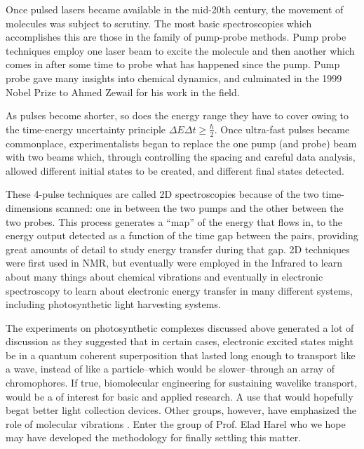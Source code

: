 Once pulsed lasers became available in the mid-20th century, the movement of molecules was subject to scrutiny.  The most basic spectroscopies which accomplishes this are those in the family of pump-probe methods.  Pump probe techniques  employ one laser beam to excite the molecule and then another which comes in after some time to probe what has happened since the pump. Pump probe gave many insights into chemical dynamics, and culminated in the 1999 Nobel Prize to Ahmed Zewail for his work in the field\cite{Zewail}.

As pulses become shorter, so does the energy range they have to cover owing to the time-energy uncertainty principle $\Delta E \Delta t \geq \frac{\hbar}{2} $.  Once ultra-fast pulses became commonplace, experimentalists began to replace the one pump (and probe) beam with two beams which, through controlling the spacing and careful data analysis, allowed different initial states to be created, and different final states detected.

These 4-pulse techniques are called 2D spectroscopies because of the two time-dimensions scanned: one in between the two pumps and the other between the two probes.  This process generates a ``map'' of the energy that flows in, to the energy output detected as a function of the time gap between the pairs, providing great amounts of detail to study energy transfer during that gap.  2D techniques were first used in NMR, but eventually were employed in the Infrared to learn about many things about chemical vibrations\cite{Takmakoff} and eventually in electronic spectroscopy to learn about electronic energy transfer in many different systems, including photosynthetic light harvesting systems\cite{FMO1,ScholesNatureReview,JoonGSBJACS}.

The experiments on photosynthetic complexes discussed above generated a lot of discussion  as they suggested that in certain cases, electronic excited states might be in a quantum coherent superposition that lasted long enough to transport like a wave, instead of like a particle--which would be slower--through an array of chromophores.  If true, biomolecular engineering for sustaining wavelike transport, would be a of interest for basic and applied research. A use that would hopefully begat better light collection devices.  Other groups, however, have emphasized the role of molecular vibrations \cite{mech1}. Enter the group of Prof. Elad Harel who we hope may have developed the methodology for finally settling this matter\cite{GAMERS}.

